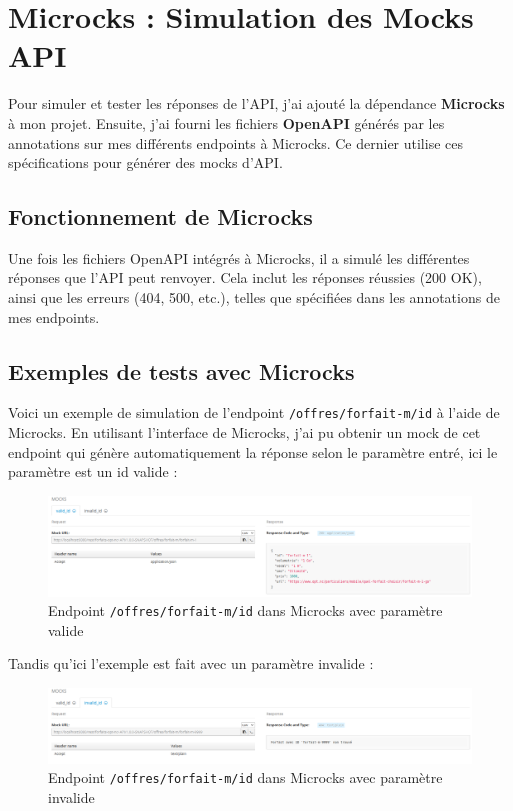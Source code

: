 \documentclass{article}
\begin{document}
	
	\section{Microcks : Simulation des Mocks API}
	
	Pour simuler et tester les réponses de l'API, j'ai ajouté la dépendance \textbf{Microcks} à mon projet. Ensuite, j'ai fourni les fichiers \textbf{OpenAPI} générés par les annotations sur mes différents endpoints à Microcks. Ce dernier utilise ces spécifications pour générer des mocks d'API.
	
	\subsection*{Fonctionnement de Microcks}
	
	Une fois les fichiers OpenAPI intégrés à Microcks, il a simulé les différentes réponses que l'API peut renvoyer. Cela inclut les réponses réussies (200 OK), ainsi que les erreurs (404, 500, etc.), telles que spécifiées dans les annotations de mes endpoints.
	
	\subsection*{Exemples de tests avec Microcks}
	
	Voici un exemple de simulation de l'endpoint \texttt{/offres/forfait-m/{id}} à l'aide de Microcks. En utilisant l'interface de Microcks, j'ai pu obtenir un mock de cet endpoint qui génère automatiquement la réponse selon le paramètre entré, ici le paramètre est un id valide : 
	
	\begin{figure}[H]
		\centering
		\includegraphics[width=\textwidth]{asset/mock_forfaitm.png}
		\caption{Endpoint \texttt{/offres/forfait-m/{id}} dans Microcks avec paramètre valide}
		\label{fig:endpoint-offres/forfait-m/{id}}
	\end{figure}
	
	Tandis qu'ici l'exemple est fait avec un paramètre invalide :
	
		\begin{figure}[H]
		\centering
		\includegraphics[width=\textwidth]{asset/microcks_invalid.png}
		\caption{Endpoint \texttt{/offres/forfait-m/{id}} dans Microcks avec paramètre invalide}
		\label{fig:endpoint-offres/forfait-m/{id}}
	\end{figure}
	
\end{document}
